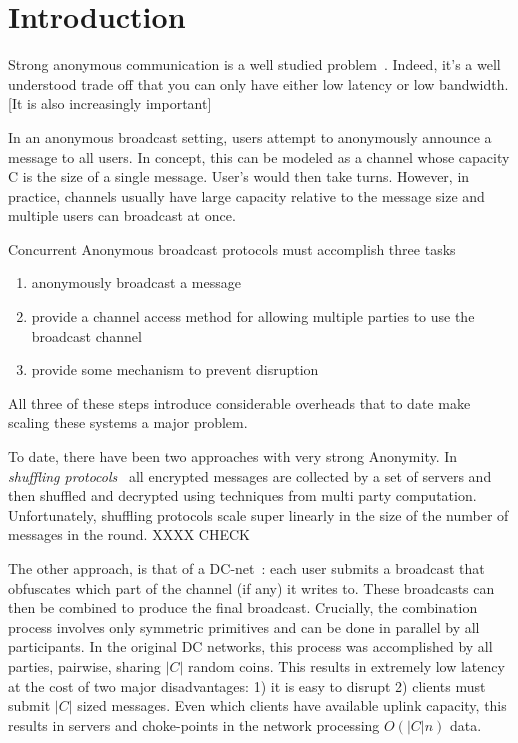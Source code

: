 
\section{Introduction}
Strong anonymous communication is a well studied problem~\cite{}. Indeed, it's a well understood trade off that you can only have either low latency or low bandwidth. [It is also increasingly important]

In an anonymous broadcast setting, users attempt to anonymously announce a message to all users. In concept, this can be modeled as a channel whose capacity C is the size of a single message. User's would then take turns. However, in practice, channels usually have large capacity relative to the message size and multiple users can broadcast at once.

Concurrent Anonymous broadcast protocols must accomplish three tasks
\begin{enumerate}
	\item anonymously broadcast a message
	\item provide a channel access method for allowing multiple parties to use the broadcast channel
	\item provide some mechanism to prevent disruption
\end{enumerate}
All three of these steps introduce considerable overheads that to date make scaling these systems a major problem.

To date, there have been two approaches with very strong Anonymity. In \emph{shuffling protocols}~\cite{CCS:LYKGKM19,USENIX:AKTZ17} all encrypted messages are collected by a set of servers and then shuffled and decrypted using techniques from multi party computation. Unfortunately, shuffling protocols scale super linearly in the size of the number of messages in the round.  XXXX CHECK

The other approach, is that of a DC-net~\cite{JC:Chaum88}: each user submits a broadcast that obfuscates which part of the channel (if any) it writes to.  These broadcasts can then be combined to produce the final broadcast. Crucially, the combination process involves only symmetric primitives and can be done in parallel by all participants. In the original DC networks, this process was accomplished  by all parties, pairwise, sharing $|C|$ random coins.
This results in extremely low latency at the cost of two major disadvantages: 1) it is easy to disrupt 2) clients must submit $|C|$ sized messages. Even which clients have available uplink capacity, this results in servers and choke-points in the network processing $O(|C|n)$ data.



